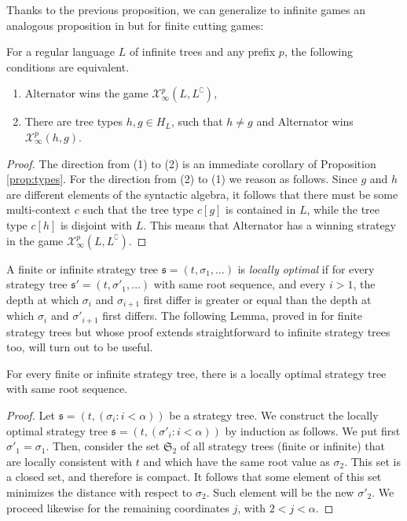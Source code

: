  Thanks to the previous proposition, we can generalize to infinite games an analogous proposition in \cite{bp} but for finite cutting games:
\begin{proposition}\label{prop:tree_to_types}
 For a regular language $L$ of infinite trees and any prefix $p$, the following conditions are equivalent.
 \begin{enumerate}
\item Alternator wins the game $\mathcal{X}^p_\infty(L, L^\complement)$, 
 \item  There are tree types $h, g\in H_L$, such that $h\neq g$ and Alternator wins $\mathcal{X}^p_\infty(h, g)$.
 \end{enumerate}
\end{proposition}
\begin{proof}
The direction from (1) to (2) is an immediate corollary of Proposition \ref{prop:types}.
For the direction from (2) to (1) we reason as follows. Since $g$ and $h$ are different elements of the syntactic algebra, it follows that there must be some multi-context $c$ such that the tree type $c[g]$ is contained in $L$, while the tree type $c[h]$ is disjoint with $L$. 
This means that Alternator has a winning strategy in the game $\mathcal{X}^p_\infty(L, L^\complement)$.
\end{proof}
A finite or infinite strategy tree $\mathfrak{s}=(t, \sigma_1, \dots)$ is \emph{locally optimal} if for every strategy tree $\mathfrak{s}'=(t, \sigma'_1, \dots)$ with same root sequence, and every $i>1$, the depth at which $\sigma_i$ and $\sigma_{i+1}$ first differ is greater or equal than the depth at which $\sigma_i$ and $\sigma'_{i+1}$ first differs.
The following Lemma, proved in \cite{bp} for finite strategy trees but whose proof extends straightforward to infinite strategy trees too, will turn out to be useful.%

\begin{lemma}\label{lemma:locallyoptimal}
For every finite or infinite strategy tree, there is a locally optimal strategy tree with same root sequence.
\end{lemma}
\begin{proof} Let $\mathfrak{s}=(t, (\sigma_i : i < \alpha))$ be a strategy tree. We construct the locally optimal strategy tree $\mathfrak{s}=(t, (\sigma'_i : i < \alpha))$ by induction as follows. We put first $\sigma'_1=\sigma_1$. Then, consider the set $\mathfrak{S}_2$ of all strategy trees (finite or infinite) that are locally consistent with $t$ and which have the same root value as $\sigma_2$. This set is a closed set, and therefore is compact. It follows that some element of this set minimizes the distance with respect to $\sigma_2$. Such element will be the new $\sigma'_2$. We proceed likewise for the remaining coordinates $j$, with $2 < j < \alpha$.
\end{proof}

